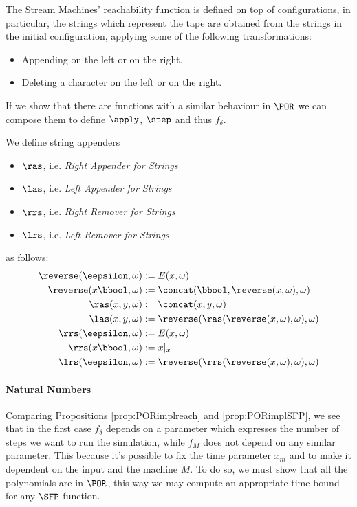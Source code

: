 \begin{conditional}{\notappendix}
  The Stream Machines' reachability function is defined on top of
  configurations, in particular, the strings which represent the tape are
  obtained from the strings in the initial configuration, applying some of the
  following transformations:
  \begin{itemize}
    \item Appending on the left or on the right.
    \item Deleting a character on the left or on the right.
  \end{itemize}
  If we show that there are functions with a similar behaviour
  in $\POR$ we can compose them to define $\apply$, $\step$ and thus $f_\delta$.
  \begin{defn}
    \label{def:apprems}
      We define string appenders
      \begin{itemize}
        \item $\ras$, i.e. \emph{Right Appender for Strings}
        \item $\las$, i.e. \emph{Left Appender for Strings}
        \item $\rrs$, i.e. \emph{Right Remover for Strings}
        \item $\lrs$, i.e. \emph{Left Remover for Strings}
      \end{itemize}
      as follows:
      \begin{align*}
        \reverse(\eepsilon, \omega) &:= E(x, \omega)\\
        \reverse(x\bbool, \omega) &:= \concat(\bbool, \reverse (x, \omega), \omega)\\%
        \ras(x, y, \omega) &:= \concat(x, y, \omega)\\%
        \las(x, y, \omega) &:=  \reverse (\ras(\reverse(x, \omega), \omega), \omega)\\%
        \rrs(\eepsilon,\omega) &:=  E(x, \omega)\\
        \rrs(x\bbool, \omega) &:=  x|_{x}\\%
        \lrs(\eepsilon, \omega) &:= \reverse (\rrs(\reverse(x, \omega), \omega), \omega)
      \end{align*}
  \end{defn}

  \paragraph{Natural Numbers}

  Comparing Propositions \ref{prop:PORimplreach} and \ref{prop:PORimplSFP},
  we see that in the first case $f_\delta$ depends on a parameter which expresses
  the number of steps we want to run the simulation, while $f_M$ does not
  depend on any similar parameter. This because it's possible to fix the
  time parameter $x_m$ and to make it dependent on the input
  and the machine $M$. To do so, we must show that all the polynomials are in
  $\POR$, this way we may compute an appropriate time bound for any
  $\SFP$ function.


\end{conditional}
